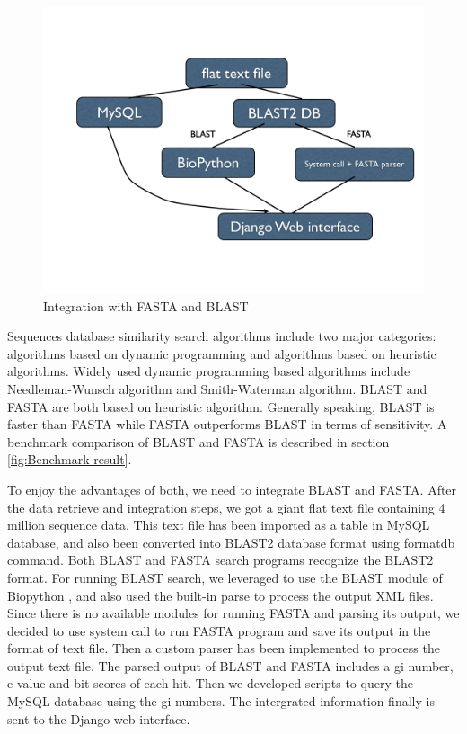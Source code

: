 \documentclass[11pt,letterpaper,twoside,english]{article}
\begin{document}
\begin{figure}[tbp]
\begin{center}
\includegraphics[width=0.6\linewidth]{figures/Data_flow}
\end{center}

\caption{\label{fig:Integration-with-FASTA}Integration with FASTA and BLAST}

\end{figure}

Sequences database similarity search algorithms include two major
categories: algorithms based on dynamic programming and algorithms
based on heuristic algorithms. Widely used dynamic programming based
algorithms include Needleman-Wunsch algorithm and Smith-Waterman algorithm.
BLAST and FASTA are both based on heuristic algorithm. Generally speaking,
BLAST is faster than FASTA while FASTA outperforms BLAST in terms
of sensitivity. A benchmark comparison of BLAST and FASTA is described
in section \ref{fig:Benchmark-result}.

To enjoy the advantages of both, we need to integrate BLAST and FASTA.  After
the data retrieve and integration steps, we got a giant flat text file
containing 4 million sequence data. This text file has been imported as a
table in MySQL database, and also been converted into BLAST2 database format
using formatdb command. Both BLAST and FASTA search programs recognize the
BLAST2 format. For running BLAST search, we leveraged to use the BLAST module
of Biopython \citet{cock_biopython:_2009}, and also used the built-in parse to
process the output XML files.  Since there is no available modules for running
FASTA and parsing its output, we decided to use system call to run FASTA
program and save its output in the format of text file. Then a custom parser
has been implemented to process the output text file. The parsed output of
BLAST and FASTA includes a gi number, e-value and bit scores of each hit. Then
we developed scripts to query the MySQL database using the gi numbers. The
intergrated information finally is sent to the Django web interface.
\end{document}
